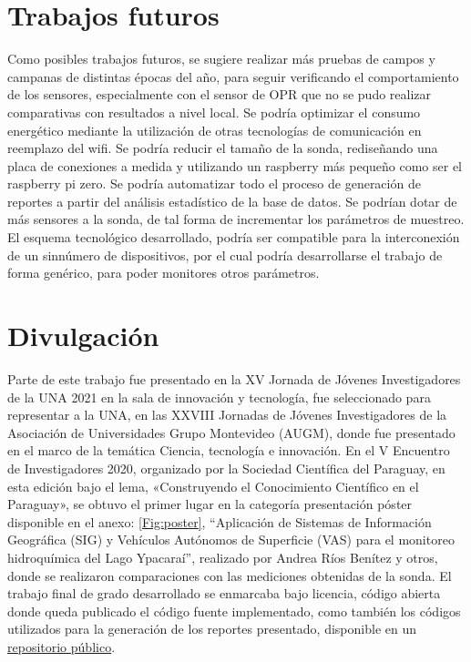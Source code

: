 \section{Trabajos futuros}
Como posibles trabajos futuros, se sugiere realizar m\'as pruebas de campos y campanas de distintas épocas del año, para seguir verificando el comportamiento de los sensores, especialmente con el sensor de OPR que no se pudo realizar comparativas con resultados a nivel local.
Se podría optimizar el consumo energético mediante la utilización de otras tecnologías de comunicación en reemplazo del wifi.
Se podría reducir el tamaño de la sonda, rediseñando una placa de conexiones a medida y utilizando un raspberry más pequeño como ser el raspberry pi zero.
Se podría automatizar todo el proceso de generación de reportes a partir del análisis estadístico de la base de datos.
Se podrían dotar de m\'as sensores a la sonda, de tal forma de incrementar los parámetros de muestreo.
El esquema tecnológico desarrollado, podría ser compatible para la interconexión de un sinnúmero de dispositivos, por el cual podría desarrollarse el trabajo de forma genérico, para poder monitores otros parámetros.

\section{Divulgaci\'on}
Parte de este trabajo fue presentado en la XV Jornada de Jóvenes Investigadores de la UNA 2021 en la sala de innovación y tecnología, fue seleccionado para representar a la UNA, en las XXVIII Jornadas de Jóvenes Investigadores de la Asociación de Universidades Grupo Montevideo (AUGM), donde fue presentado en el marco de la temática Ciencia, tecnología e innovación. 
En el V Encuentro de Investigadores 2020, organizado por la Sociedad Científica del Paraguay, en esta edición bajo el lema, «Construyendo el Conocimiento Científico en el Paraguay», se obtuvo el primer lugar en la categoría presentación póster disponible en el anexo: \ref{Fig:poster}, “Aplicación de Sistemas de Información Geográfica (SIG) y Vehículos Autónomos de Superficie (VAS) para el monitoreo hidroquímica del Lago Ypacaraí”, realizado por  Andrea Ríos Benítez y otros, donde se realizaron comparaciones con las mediciones obtenidas de la sonda.
El trabajo final de grado desarrollado se enmarcaba bajo licencia, código abierta donde queda publicado el código fuente implementado, como también los códigos utilizados para la generación de los reportes presentado, disponible en un \href{https://github.com/RodPy/FIUNA-LSD-SONDA}{repositorio p\'ublico}.
